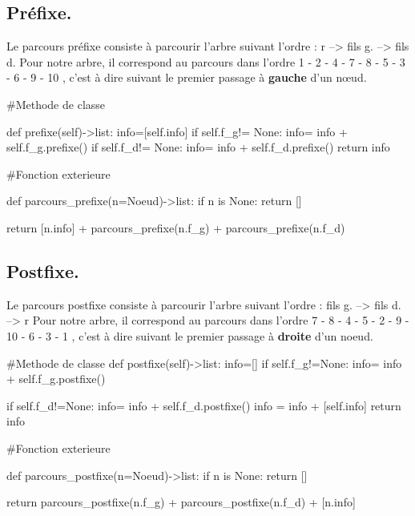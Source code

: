 \documentclass{article}
\begin{document}
\subsection{Préfixe.}
Le parcours préfixe consiste à parcourir l'arbre suivant l'ordre : r --> fils g. --> fils d.
 Pour notre arbre, il correspond au parcours dans 
 l’ordre 1 - 2 - 4 - 7 - 8 - 5 - 3 - 6 - 9 - 10 , 
 c’est à dire suivant le premier passage à \textbf{gauche} d’un nœud.
\begin{python}
    #Methode de classe

    def prefixe(self)->list:
        info=[self.info]
        if self.f_g!= None:
            info= info + self.f_g.prefixe()
        if self.f_d!= None:
            info= info + self.f_d.prefixe() 
        return info

    #Fonction exterieure

    def parcours_prefixe(n=Noeud)->list:
        if n is None:
            return []
        
        return [n.info] + parcours_prefixe(n.f_g) + parcours_prefixe(n.f_d)


\end{python}
\subsection{Postfixe.}
Le parcours postfixe consiste à parcourir l'arbre suivant l'ordre : fils g. --> fils d. --> r
 Pour notre arbre, il correspond au parcours dans 
 l’ordre 7 - 8 - 4 - 5 - 2 - 9 - 10 - 6 - 3 - 1 ,
 c'est à dire suivant le premier passage à \textbf{droite} d'un noeud.

\begin{python}
    #Methode de classe
    def postfixe(self)->list:
        info=[]
        if self.f_g!=None:
            info= info + self.f_g.postfixe()  
            
        if self.f_d!=None:
            info= info + self.f_d.postfixe()
        info = info + [self.info]
        return info

    #Fonction exterieure

    def parcours_postfixe(n=Noeud)->list:
        if n is None:
            return []
        
        return parcours_postfixe(n.f_g) + parcours_postfixe(n.f_d) + [n.info]
\end{python}
\newpage
\end{document}
